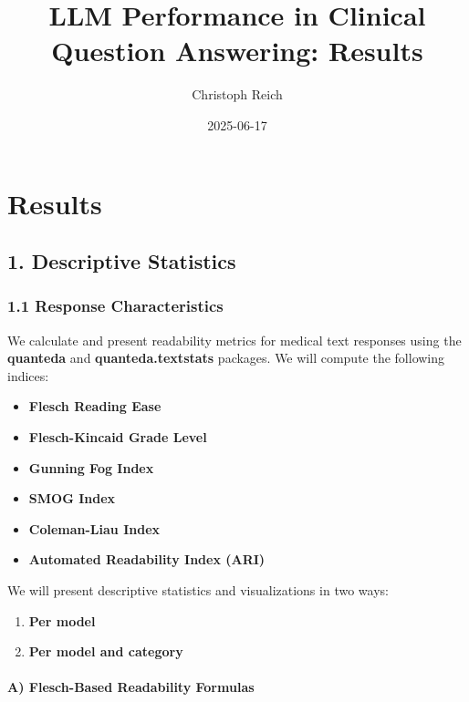 \documentclass[
  11pt]{report}
\title{LLM Performance in Clinical Question Answering: Results}
\author{Christoph Reich}
\date{2025-06-17}
\providecommand{\tightlist}{%
  \setlength{\itemsep}{0pt}\setlength{\parskip}{0pt}}\usepackage{longtable,booktabs,array}
\renewcommand*\contentsname{Table of contents}
\newcommand\contentsname{Table of contents}
\begin{document}
\maketitle

\renewcommand*\contentsname{Table of contents}
{
\hypersetup{linkcolor=}
\setcounter{tocdepth}{2}
\tableofcontents
}

\chapter{Results}\label{results}

\section{1. Descriptive Statistics}\label{descriptive-statistics}

\subsection{1.1 Response
Characteristics}\label{response-characteristics}

We calculate and present readability metrics for medical text responses
using the \textbf{quanteda} and \textbf{quanteda.textstats} packages. We
will compute the following indices:

\begin{itemize}
\tightlist
\item
  \textbf{Flesch Reading Ease}
\item
  \textbf{Flesch-Kincaid Grade Level}
\item
  \textbf{Gunning Fog Index}
\item
  \textbf{SMOG Index}
\item
  \textbf{Coleman-Liau Index}
\item
  \textbf{Automated Readability Index (ARI)}
\end{itemize}

We will present descriptive statistics and visualizations in two ways:

\begin{enumerate}
\def\labelenumi{\arabic{enumi}.}
\tightlist
\item
  \textbf{Per model}
\item
  \textbf{Per model and category}
\end{enumerate}

\subsubsection{A) Flesch-Based Readability
Formulas}\label{a-flesch-based-readability-formulas}
\end{document}
